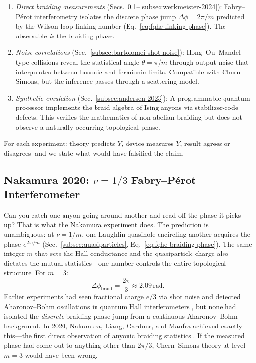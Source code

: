 \begin{enumerate}
  \item[(a)] \emph{Direct braiding measurements} (Secs.~\ref{subsec:nakamura-2020}--\ref{subsec:werkmeister-2024}): Fabry--P\'erot interferometry isolates the discrete phase jump $\Delta\phi = 2\pi/m$ predicted by the Wilson-loop linking number (Eq.~\ref{eq:fqhe-linking-phase}).  The observable \emph{is} the braiding phase.

  \item[(b)] \emph{Noise correlations} (Sec.~\ref{subsec:bartolomei-shot-noise}): Hong--Ou--Mandel-type collisions reveal the statistical angle $\theta = \pi/m$ through output noise that interpolates between bosonic and fermionic limits.  Compatible with Chern--Simons, but the inference passes through a scattering model.

  \item[(c)] \emph{Synthetic emulation} (Sec.~\ref{subsec:andersen-2023}): A programmable quantum processor implements the braid algebra of Ising anyons via stabilizer-code defects.  This verifies the mathematics of non-abelian braiding but does not observe a naturally occurring topological phase.
\end{enumerate}

\noindent For each experiment: theory predicts $Y$, device measures $Y$, result agrees or disagrees, and we state what would have falsified the claim.

\subsection{Nakamura 2020: $\nu = 1/3$ Fabry--P\'erot Interferometer}
\label{subsec:nakamura-2020}

Can you catch one anyon going around another and read off the phase it picks up?  That is what the Nakamura experiment does.  The prediction is unambiguous: at $\nu = 1/m$, one Laughlin quasihole encircling another acquires the phase $e^{2\pi i/m}$ (Sec.~\ref{subsec:quasiparticles}, Eq.~\ref{eq:fqhe-braiding-phase}).  The same integer $m$ that sets the Hall conductance and the quasiparticle charge also dictates the mutual statistics---one number controls the entire topological structure.  For $m = 3$:
\begin{equation}
  \Delta\phi_{\mathrm{braid}} = \frac{2\pi}{3} \approx 2.09\,\text{rad}.
  \label{eq:nakamura-prediction}
\end{equation}
Earlier experiments had seen fractional charge $e/3$ via shot noise \cite{Saminadayar1997FractionalCharge,dePicciotto1997FractionalCharge} and detected Aharonov--Bohm oscillations in quantum Hall interferometers \cite{CaminoZhouGoldman2005ABSuperperiod}, but none had isolated the \emph{discrete} braiding phase jump from a continuous Aharonov--Bohm background.  In 2020, Nakamura, Liang, Gardner, and Manfra achieved exactly this---the first direct observation of anyonic braiding statistics \cite{Nakamura2020AnyonicBraiding}.  If the measured phase had come out to anything other than $2\pi/3$, Chern--Simons theory at level $m=3$ would have been wrong.

